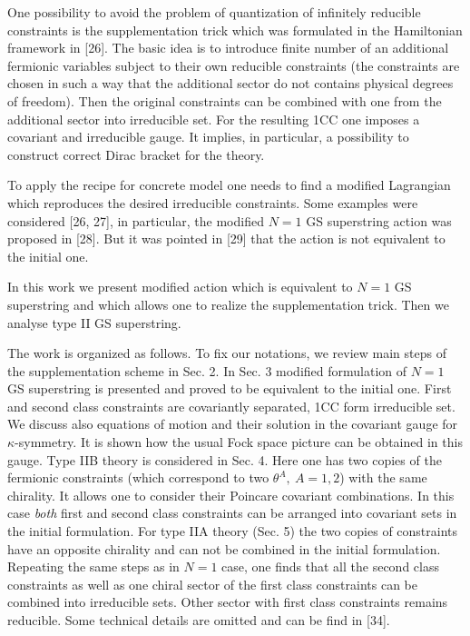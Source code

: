 \documentclass[a4paper]{article}
\begin{document}
One possibility to avoid the problem of quantization of infinitely 
reducible constraints is the supplementation trick which was formulated 
in the Hamiltonian framework in [26]. The basic idea is to introduce 
finite number of an additional fermionic variables subject to their 
own reducible 
constraints (the constraints are chosen in such a way that the additional 
sector do not contains physical degrees of freedom). Then the original 
constraints can be combined with one from the additional sector into 
irreducible set. For the resulting 1CC one imposes a covariant 
and irreducible 
gauge. It implies, in particular, a possibility to construct correct 
Dirac bracket for the theory. 

To apply the recipe for concrete model one needs to find a modified 
Lagrangian which reproduces the desired irreducible constraints. 
Some examples were considered [26, 27], in particular, the modified 
$N=1$ GS superstring  action was proposed in [28]. But it was pointed 
in [29]  that the action is not equivalent to the initial one.

In this work we present modified action which is equivalent to $N=1$ 
GS superstring and which allows one to realize the supplementation 
trick. Then we analyse type II GS superstring.  

The work is organized as follows. To fix our notations, we review main 
steps of the supplementation scheme in Sec. 2. 
In Sec. 3 modified formulation
of $N=1$ GS superstring is presented and proved to be
equivalent to the initial one. First and second class constraints are
covariantly separated, 1CC form irreducible set. We discuss also 
equations of motion
and their solution in the covariant gauge for $\kappa$-symmetry. 
It is shown how the usual Fock space picture can be obtained in this 
gauge. Type IIB theory is considered in Sec. 4. Here one 
has two copies of the fermionic constraints (which correspond
to two $\theta^A, ~ A=1,2$) with the same chirality. It allows one to
consider their Poincare covariant combinations. In this case 
{\em{both}} first
and second class constraints can be arranged into covariant sets in the
initial formulation. For type IIA theory (Sec. 5) the two copies of
constraints have an opposite chirality and can not be combined in the
initial formulation. Repeating the same steps as in $N=1$ case, one
finds that all the second class constraints as well as one chiral sector
of the first class constraints can be combined into irreducible sets.
Other sector with first class constraints remains reducible. 
Some technical details are omitted and can be find 
in [34].
\end{document}
